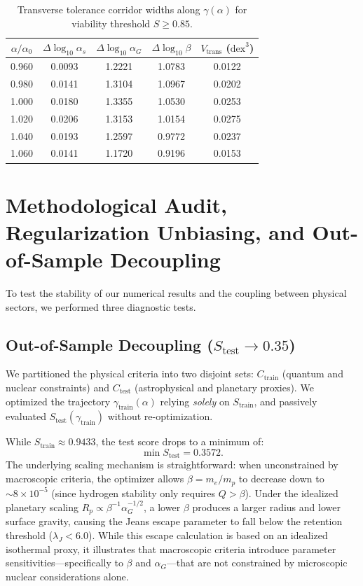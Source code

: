 \documentclass[aps,prd,twocolumn,superscriptaddress,nofootinbib,floatfix]{revtex4-2}
\begin{document}
\begin{table}[b]
\caption{\label{tab:corridor}Transverse tolerance corridor widths along $\gamma(\alpha)$ for viability threshold $S \ge 0.85$.}
\begin{ruledtabular}
\begin{tabular}{ccccc}
$\alpha / \alpha_0$ & $\Delta \log_{10}\alpha_s$ & $\Delta \log_{10}\alpha_G$ & $\Delta \log_{10}\beta$ & $V_{\text{trans}}$ ($\text{dex}^3$) \\
\hline
0.960 & 0.0093 & 1.2221 & 1.0783 & 0.0122 \\
0.980 & 0.0141 & 1.3104 & 1.0967 & 0.0202 \\
1.000 & 0.0180 & 1.3355 & 1.0530 & 0.0253 \\
1.020 & 0.0206 & 1.3153 & 1.0154 & 0.0275 \\
1.040 & 0.0193 & 1.2597 & 0.9772 & 0.0237 \\
1.060 & 0.0141 & 1.1720 & 0.9196 & 0.0153 \\
\end{tabular}
\end{ruledtabular}
\end{table}

\section{Methodological Audit, Regularization Unbiasing, and Out-of-Sample Decoupling}
\label{sec:audit}

To test the stability of our numerical results and the coupling between physical sectors, we performed three diagnostic tests.

\subsection{Out-of-Sample Decoupling ($S_{\text{test}} \to 0.35$)}

We partitioned the physical criteria into two disjoint sets: $C_{\text{train}}$ (quantum and nuclear constraints) and $C_{\text{test}}$ (astrophysical and planetary proxies). We optimized the trajectory $\gamma_{\text{train}}(\alpha)$ relying \textit{solely} on $S_{\text{train}}$, and passively evaluated $S_{\text{test}}(\gamma_{\text{train}})$ without re-optimization.

While $S_{\text{train}} \approx 0.9433$, the test score drops to a minimum of:
\begin{equation}
    \min S_{\text{test}} = 0.3572.
\end{equation}
The underlying scaling mechanism is straightforward: when unconstrained by macroscopic criteria, the optimizer allows $\beta = m_e/m_p$ to decrease down to $\sim 8 \times 10^{-5}$ (since hydrogen stability only requires $Q > \beta$). Under the idealized planetary scaling $R_p \propto \beta^{-1} \alpha_G^{-1/2}$, a lower $\beta$ produces a larger radius and lower surface gravity, causing the Jeans escape parameter to fall below the retention threshold ($\lambda_J < 6.0$). While this escape calculation is based on an idealized isothermal proxy, it illustrates that macroscopic criteria introduce parameter sensitivities—specifically to $\beta$ and $\alpha_G$—that are not constrained by microscopic nuclear considerations alone.
\end{document}
